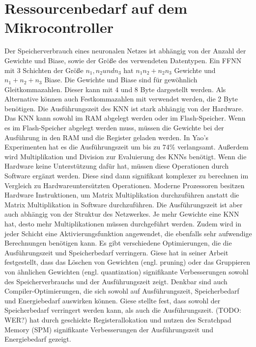 \section{Ressourcenbedarf auf dem Mikrocontroller}
Der Speicherverbrauch eines neuronalen Netzes ist abhängig von der Anzahl der Gewichte und Biase, sowie der Größe des verwendeten Datentypen.
Ein FFNN mit 3 Schichten der Größe $n_1, n_2 und n_3$ hat $n_1 n_2 + n_2 n_3$ Gewichte und $n_1 + n_2 + n_3$ Biase.
Die Gewichte und Biase sind für gewöhnlich Gleitkommazahlen. Dieser kann mit 4 und 8 Byte dargestellt werden.
Als Alternative können auch Festkommazahlen mit verwendet werden, die 2 Byte benötigen.
\newline
\newline
Die Ausführungszeit des KNN ist stark abhängig von der Hardware.
Das KNN kann sowohl im RAM abgelegt werden oder im Flash-Speicher.
Wenn es im Flash-Speicher abgelegt werden muss, müssen die Gewichte bei der Ausführung in den RAM und die Register geladen werden.
In Yao's Experimenten hat es die Ausführungszeit um bis zu 74\% verlangsamt.
\newline
\newline
Außerdem wird Multiplikation und Division zur Evaluierung des KNNs benötigt.
Wenn die Hardware keine Unterstützung dafür hat, müssen diese Operationen durch Software ergänzt werden.
Diese sind dann signifikant komplexer zu berechnen im Vergleich zu Hardwareuntersützten Operationen.
Moderne Prozessoren besitzen Hardware Instruktionen, um Matrix Multiplikation durchzuführen anstatt
die Matrix Multiplikation in Software durchzuführen.
\newline
\newline
Die Ausführungszeit ist aber auch abhängig von der Struktur des Netzwerkes.
Je mehr Gewichte eine KNN hat, desto mehr Multiplikationen müssen durchgeführt werden.
Zudem wird in jeder Schicht eine Aktivierungsfunktion angewendet, die ebenfalls sehr aufwendige Berechnungen benötigen kann.
\newline
\newline
Es gibt verschiedene Optimierungen, die die Ausführungszeit und Speicherbedarf verringern.
Giese hat in seiner Arbeit festgestellt, dass das Löschen von Gewichten (engl. pruning) oder das Gruppieren von ähnlichen Gewichten (engl. quantization)
signifikante Verbesserungen sowohl des Speicherverbrauchs und der Ausführungszeit zeigt.
Denkbar sind auch Compiler-Optimierungen, die sich sowohl auf Ausführungszeit, Speicherbedarf und Energiebedarf auswirken können.
Giese stellte fest, dass sowohl der Speicherbedarf verringert werden kann, als auch die Ausführungszeit.
(TODO: WER?) hat durch geschickte Registerallokation und nutzen des Scratchpad Memory (SPM) signifikante
Verbesserungen der Ausführungszeit und Energiebedarf gezeigt.